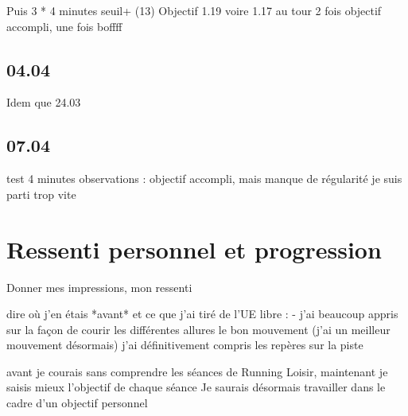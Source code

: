 \documentclass{article}%
\begin{document}
        Puis 3 * 4 minutes seuil+ (13)
        Objectif 1.19 voire 1.17 au tour
        2 fois objectif accompli, une fois boffff
        
        
    \subsection{04.04}
        Idem que 24.03
        
        
    \subsection{07.04}
        test 4 minutes
        observations : objectif accompli, mais manque de régularité
        je suis parti trop vite
        
\section{Ressenti personnel et progression}
    Donner mes impressions, mon ressenti
    
    
    dire où j'en étais *avant* et ce que j'ai tiré de l'UE libre :
    - j'ai beaucoup appris sur la façon de courir
    les différentes allures
    le bon mouvement (j'ai un meilleur mouvement désormais)
    j'ai définitivement compris les repères sur la piste
    
    avant je courais sans comprendre les séances de Running Loisir, maintenant je saisis mieux l'objectif de chaque séance
    Je saurais désormais travailler dans le cadre d'un objectif personnel
\end{document}
